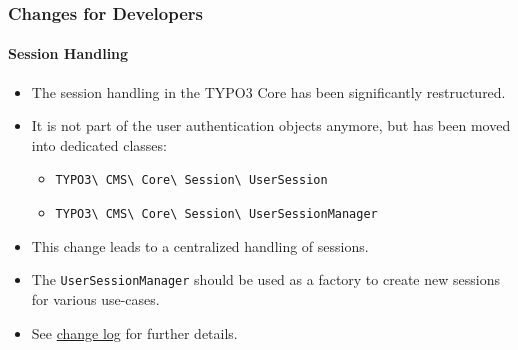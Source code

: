 %

\begin{frame}[fragile]
	\frametitle{Changes for Developers}
	\framesubtitle{Session Handling}

	\lstset{basicstyle=\tiny\ttfamily}

	\begin{itemize}
		\item The session handling in the TYPO3 Core has been significantly restructured.
		\item It is not part of the user authentication objects anymore,
			but has been moved into dedicated classes:

			\begin{itemize}\small
				\item \texttt{TYPO3\textbackslash
					CMS\textbackslash
					Core\textbackslash
					Session\textbackslash
					UserSession}
				\item \texttt{TYPO3\textbackslash
					CMS\textbackslash
					Core\textbackslash
					Session\textbackslash
					UserSessionManager}
			\end{itemize}

		\item This change leads to a centralized handling of sessions.
		\item The \texttt{UserSessionManager} should be used as a factory to
			create new sessions for various use-cases.
		\item See
			\href{https://docs.typo3.org/c/typo3/cms-core/master/en-us/Changelog/11.0/Feature-93023-IntroduceUserSessionAndUserSessionManager.html}{change log}
			for further details.
	\end{itemize}

\end{frame}

